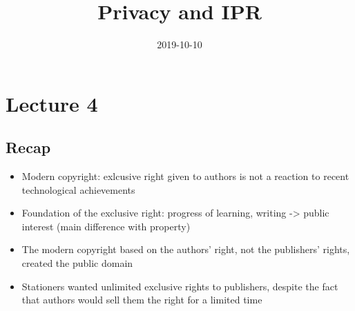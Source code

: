 \documentclass{article}
\title{Privacy and IPR}
\date{2019-10-10}
\begin{document}
   \maketitle
   \newpage

\section{Lecture 4}

\subsection{Recap}
\begin{itemize}
\item Modern copyright: exlcusive right given to authors is not a reaction to recent technological achievements
\item Foundation of the exclusive right: progress of  learning, writing -> public interest  (main difference with property)
\item The modern copyright based on the authors' right, not the publishers' rights, created the public domain
\item Stationers wanted unlimited exclusive rights to publishers, despite the fact that authors would sell them the right for a limited time 
\end{itemize}
\end{document}
